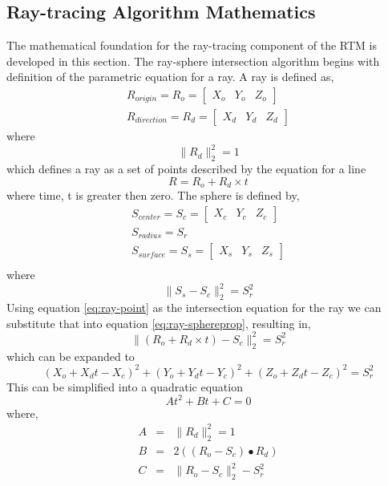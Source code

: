 \subsection{Ray-tracing Algorithm Mathematics}
The mathematical foundation for the ray-tracing component of the RTM is developed in this section. The ray-sphere intersection algorithm begins with definition of the parametric equation for a ray. A ray is defined as,
\begin{equation}
\begin{split}
R_{origin} = R_o = \left[ \begin{matrix} X_o&Y_o&Z_o \end{matrix}\right]\\
R_{direction} = R_d = \left[ \begin{matrix} X_d&Y_d&Z_d \end{matrix}\right]
\end{split}
\end{equation}
where
\begin{equation}
\|R_d\|_2^2 = 1
\end{equation}
which defines a ray as a set of points described by the equation for a line
\begin{equation}\label{eq:ray-point}
R = R_o + R_d \times t
\end{equation}
where time, t is greater then zero. The sphere is defined by,
\begin{equation}
\begin{split}
S_{center} = S_c = \left[ \begin{matrix} X_c&Y_c&Z_c \end{matrix}\right]\\
S_{radius} = S_r \\
S_{surface} = S_s = \left[ \begin{matrix} X_s&Y_s&Z_s \end{matrix}\right]\\
\end{split}
\end{equation}
where
\begin{equation} \label{eq:ray-sphereprop}
\| S_s - S_c \|_2^2 = S_r^2
\end{equation}
Using equation \ref{eq:ray-point} as the intersection equation for the ray we can substitute that into equation \ref{eq:ray-sphereprop}, resulting in,
\begin{equation}
\| (R_o +R_d \times t) - S_c \|_2^2 = S_r^2
\end{equation}
which can be expanded to
\begin{equation}
(X_o +X_dt - X_c)^2 + (Y_o +Y_dt - Y_c)^2 + (Z_o +Z_dt - Z_c)^2 = S_r^2
\end{equation}
This can be simplified into a quadratic equation
\begin{equation}
At^2 + Bt+C =0
\end{equation}
where,
\begin{eqnarray}
A &=& \|R_d\|_2^2 = 1\\
B &=& 2 \left( \left( R_o -S_c \right) \bullet R_d \right)\\
C &=& \| R_o - S_c \|_2^2 - S_r^2
\end{eqnarray}

